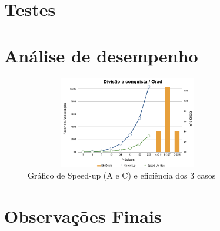 \documentclass{article}
\begin{document}
\begin{multicols*}{2}
\section{Testes}

\section{Análise de desempenho}

\begin{figure}[H]
            \centering
            \vspace{-1.1em}
            \includegraphics[width=9cm, height=4cm]{grafico.png}
            \vspace{-1.9em}
            \caption{Gráfico de Speed-up (A e C) e eficiência dos 3 casos}
            \vspace{-1.2em}
\end{figure}
\section{Observações Finais}


\end{multicols*}

\newpage


\end{document}
